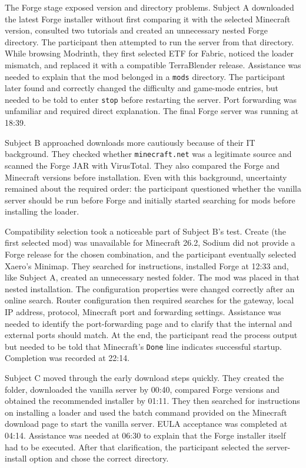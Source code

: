 The Forge stage exposed version and directory problems. Subject A downloaded the latest Forge installer without first comparing it with the selected Minecraft version, consulted two tutorials and created an unnecessary nested Forge directory. The participant then attempted to run the server from that directory. While browsing Modrinth, they first selected ETF for Fabric, noticed the loader mismatch, and replaced it with a compatible TerraBlender release. Assistance was needed to explain that the mod belonged in a \texttt{mods} directory. The participant later found and correctly changed the difficulty and game-mode entries, but needed to be told to enter \texttt{stop} before restarting the server. Port forwarding was unfamiliar and required direct explanation. The final Forge server was running at 18:39.

Subject B approached downloads more cautiously because of their IT background. They checked whether \texttt{minecraft.net} was a legitimate source and scanned the Forge JAR with VirusTotal. They also compared the Forge and Minecraft versions before installation. Even with this background, uncertainty remained about the required order: the participant questioned whether the vanilla server should be run before Forge and initially started searching for mods before installing the loader.

Compatibility selection took a noticeable part of Subject B's test. Create (the first selected mod) was unavailable for Minecraft 26.2, Sodium did not provide a Forge release for the chosen combination, and the participant eventually selected Xaero's Minimap. They searched for instructions, installed Forge at 12:33 and, like Subject A, created an unnecessary nested folder. The mod was placed in that nested installation. The configuration properties were changed correctly after an online search. Router configuration then required searches for the gateway, local IP address, protocol, Minecraft port and forwarding settings. Assistance was needed to identify the port-forwarding page and to clarify that the internal and external ports should match. At the end, the participant read the process output but needed to be told that Minecraft's \texttt{Done} line indicates successful startup. Completion was recorded at 22:14.

Subject C moved through the early download steps quickly. They created the folder, downloaded the vanilla server by 00:40, compared Forge versions and obtained the recommended installer by 01:11. They then searched for instructions on installing a loader and used the batch command provided on the Minecraft download page to start the vanilla server. EULA acceptance was completed at 04:14. Assistance was needed at 06:30 to explain that the Forge installer itself had to be executed. After that clarification, the participant selected the server-install option and chose the correct directory.

